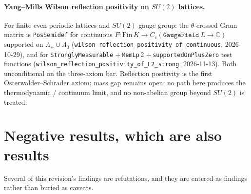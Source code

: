 \paragraph{Yang--Mills Wilson reflection positivity on $SU(2)$ lattices.}
For finite even periodic lattices and $SU(2)$ gauge group: the
$\theta$-crossed Gram matrix is \texttt{PosSemidef} for continuous
$F : \mathrm{Fin}\,K \to C_c(\mathtt{GaugeField}\ L \to \mathbb{C})$
supported on $\Lambda_+ \cup \Lambda_0$
(\texttt{wilson\_reflection\_positivity\_of\_continuous},
2026-10-29), and for \texttt{StronglyMeasurable} $+\,$\texttt{MemLp}\,2
$+\,$\texttt{supportedOnPlusZero} test functions
(\texttt{wilson\_reflection\_positivity\_of\_L2\_strong},
2026-11-13).  Both unconditional on the three-axiom bar.  Reflection
positivity is the first Osterwalder--Schrader axiom; mass gap remains
open; no path here produces the thermodynamic / continuum limit, and
no non-abelian group beyond $SU(2)$ is treated.

\section*{Negative results, which are also results}

Several of this revision's findings are refutations, and they are entered as
findings rather than buried as caveats.

